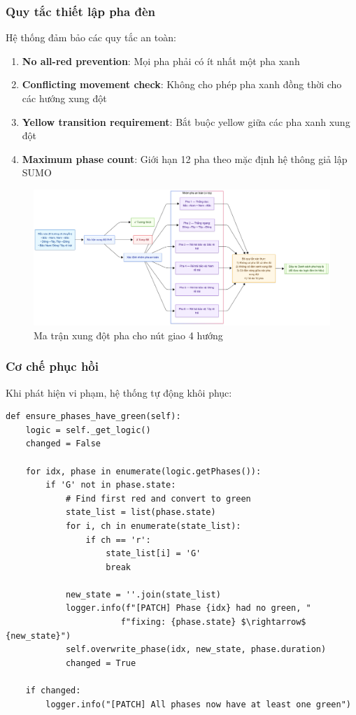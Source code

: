 \subsubsection{Quy tắc thiết lập pha đèn}

Hệ thống đảm bảo các quy tắc an toàn:

\begin{enumerate}
    \item \textbf{No all-red prevention}: Mọi pha phải có ít nhất một pha xanh
    \item \textbf{Conflicting movement check}: Không cho phép pha xanh đồng thời cho các hướng xung đột
    \item \textbf{Yellow transition requirement}: Bắt buộc yellow giữa các pha xanh xung đột
    \item \textbf{Maximum phase count}: Giới hạn 12 pha theo mặc định hệ thông giả lập SUMO
\end{enumerate}

\begin{figure}[htbp]
    \centering
    \includegraphics[width=1.0\linewidth]{Untitled diagram _ Mermaid Chart-2025-08-22-074409.png}
    \caption{Ma trận xung đột pha cho nút giao 4 hướng}
    \label{fig:conflict_matrix}
\end{figure}
\subsubsection{Cơ chế phục hồi}

Khi phát hiện vi phạm, hệ thống tự động khôi phục:

\begin{lstlisting}[style=py, caption={Automatic conflict resolution}]
def ensure_phases_have_green(self):
    logic = self._get_logic()
    changed = False
    
    for idx, phase in enumerate(logic.getPhases()):
        if 'G' not in phase.state:
            # Find first red and convert to green
            state_list = list(phase.state)
            for i, ch in enumerate(state_list):
                if ch == 'r':
                    state_list[i] = 'G'
                    break
                    
            new_state = ''.join(state_list)
            logger.info(f"[PATCH] Phase {idx} had no green, "
                       f"fixing: {phase.state} $\rightarrow$ {new_state}")
            self.overwrite_phase(idx, new_state, phase.duration)
            changed = True
            
    if changed:
        logger.info("[PATCH] All phases now have at least one green")
\end{lstlisting}

